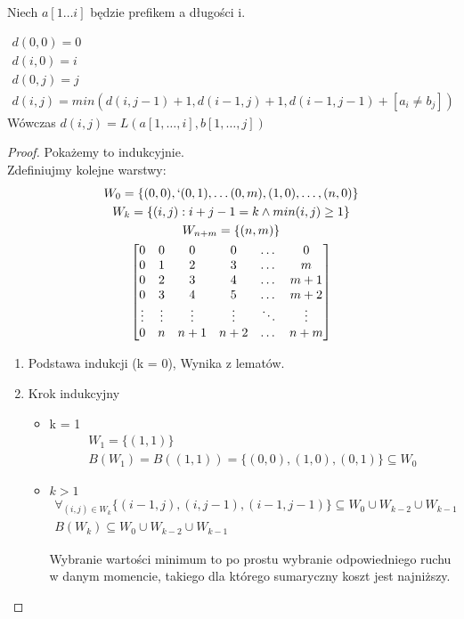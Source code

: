 \documentclass[paper=a4, fontsize=11pt]{article}
\begin{document}
\begin{mydef}[Prefiks]
Niech $a[1 \dots i]$ będzie prefikem a długości i.
\end{mydef}
\begin{theorem} 
\begin{gather*}
d(0,0) = 0 \\
d(i,0) = i \\
d(0,j) = j \\
d(i, j) = min(d(i, j-1) + 1 , d(i-1, j) + 1, d(i-1, j-1) + [a_i \neq b_j])
\end{gather*}
Wówczas $d(i, j) = L(a[1, \dots, i], b[1, \dots, j])$
\end{theorem}
\begin{proof} Pokażemy to indukcyjnie. \\
Zdefiniujmy kolejne warstwy:
\begin{gather*}
W_0 = \{(0, 0), `(0, 1), \dots (0, m), (1, 0), \dots, (n, 0) \} \\
W_k = \{(i, j) : i + j - 1 = k \land min(i, j) \ge 1 \} \\
W_{n+m} = \{(n, m)\} \\
\begin{bmatrix}
0 & 0 & 0 & 0 & \dots & 0 \\
0 & 1 & 2 & 3 & \dots & m \\
0 & 2 & 3 & 4 & \dots & m + 1 \\
0 & 3 & 4 & 5 & \dots & m + 2\\
\vdots & \vdots & \vdots & \vdots & \ddots & \vdots \\
0 & n & n+1 & n+2 & \dots & n+m
\end{bmatrix}
\end{gather*}
\begin{enumerate}
\item Podstawa indukcji (k = 0), Wynika z lematów.
\item Krok indukcyjny
\begin{itemize}
\item k = 1 \\
\begin{gather}
W_1 = \{(1, 1)\} \\
B({W_1}) = B((1,1)) = \{(0,0), (1,0), (0,1) \} \subseteq W_0
\end{gather}
\item $k > 1$ \\
\begin{gather*}
\forall_{(i, j) \in W_k} \{(i-1, j), (i, j-1), (i-1, j-1)\} \subseteq W_0 \cup W_{k-2} \cup W_{k-1} \\
B(W_k) \subseteq W_0 \cup W_{k-2}  \cup W_{k-1}
\end{gather*}

Wybranie wartości minimum to po prostu wybranie odpowiedniego ruchu w danym momencie, takiego dla którego sumaryczny koszt jest najniższy.
\end{itemize}

\end{enumerate}

\end{proof}
\end{document}
